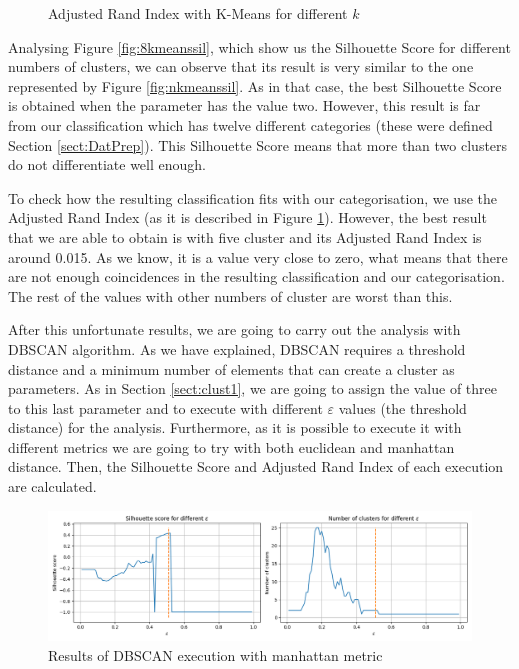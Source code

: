 \begin{figure}
\begin{minipage}[b]{0.4\paperwidth}
		\caption{Adjusted Rand Index with K-Means for different $k$}%
		\label{fig:8kmeansari}
	\end{minipage}
\end{figure}

Analysing Figure \ref{fig:8kmeanssil}, which show us the Silhouette Score for different numbers of clusters, we can observe that its result is very similar to the one represented by Figure \ref{fig:nkmeanssil}. As in that case, the best Silhouette Score is obtained when the parameter has the value two. However, this result is far from our classification which has twelve different categories (these were defined Section \ref{sect:DatPrep}). This Silhouette Score means that more than two clusters do not differentiate well enough.

To check how the resulting classification fits with our categorisation, we use the Adjusted Rand Index (as it is described in Figure \ref{fig:8kmeansari}). However, the best result that we are able to obtain is with five cluster and its Adjusted Rand Index is around 0.015. As we know, it is a value very close to zero, what means that there are not enough coincidences in the resulting classification and our categorisation. The rest of the values with other numbers of cluster are worst than this.

After this unfortunate results, we are going to carry out the analysis with DBSCAN algorithm. As we have explained, DBSCAN requires a threshold distance and a minimum number of elements that can create a cluster as parameters. As in Section \ref{sect:clust1}, we are going to assign the value of three to this last parameter and to execute with different $\varepsilon$ values (the threshold distance) for the analysis. Furthermore, as it is possible to execute it with different metrics we are going to try with both euclidean and manhattan distance. Then, the Silhouette Score and Adjusted Rand Index of each execution are calculated.

\begin{figure}
	\centering%
	\centerline{\includegraphics[width=\textwidth]{Imagenes/Bitmap/Clustering/dbscan8sil.png}}%
	\caption{Results of DBSCAN execution with manhattan metric}%
	\label{fig:dbscanman}
\end{figure}

